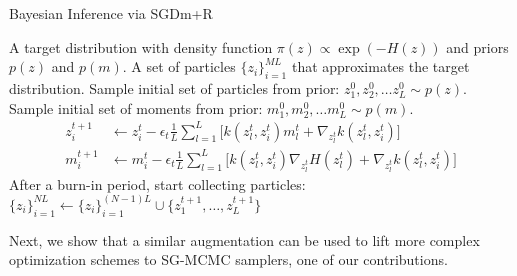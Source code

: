 \begin{algorithm}[ht] %
\caption{Bayesian Inference via SGDm+R}  
\label{alg:alg2}
\begin{algorithmic}
 A target distribution with density function $\pi({z}) \propto \exp (-H({z}))$ and priors $p({z})$ and $p({m})$.
 A set of particles $\{{z}_i\}_{i=1}^{ML}$ that approximates the target distribution.  
\State Sample initial set of particles from prior: ${z}_1^0, {z}_2^0, \ldots {z}_L^0 \sim p({z})$.
\State Sample initial set of moments from prior: ${m}_1^0, {m}_2^0, \ldots {m}_L^0 \sim p({m})$.
\State 
\begin{align*} 
{z}_i^{t+1}  &\gets  {z}_i^t - \epsilon_t \frac{1}{L}\sum_{l=1}^L\big[  k({z}_l^t, {z}_i^t)  {m}_l^t + \nabla_{{z}_l^t} k({z}_l^t, {z}_i^t)\big] \\
{m}_i^{t+1}  &\gets  {m}_i^t - \epsilon_t \frac{1}{L}\sum_{l=1}^L\big[  k({z}_l^t, {z}_i^t)  \nabla_{{z}_l^t} H({z}_l^t) + \nabla_{{z}_l^t} k({z}_l^t, {z}_i^t)\big] %
\end{align*}
\State After a burn-in period, start collecting particles: $ \{{z}_i\}_{i=1}^{NL} \gets \{{z}_i\}_{i=1}^{(N-1)L} \cup \{ {z}_1^{t+1}, \ldots,  {z}_L^{t+1} \} $ 
\EndFor
\end{algorithmic}
\end{algorithm}

Next, we show that a similar augmentation can be used to lift more complex optimization schemes to SG-MCMC samplers, one of our contributions.

